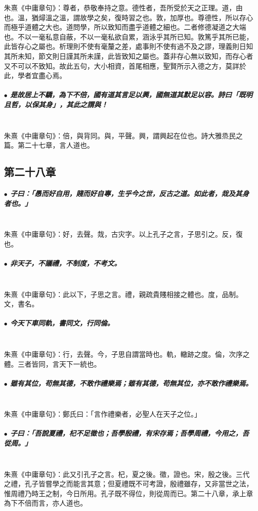 \documentclass[hyperref, UTF8, 12pt, a4paper]{ctexrep}
\begin{document}
朱熹《中庸章句》：尊者，恭敬奉持之意。德性者，吾所受於天之正理。道，由也。溫，猶燖溫之溫，謂故學之矣，復時習之也。敦，加厚也。尊德性，所以存心而極乎道體之大也。道問學，所以致知而盡乎道體之細也。二者修德凝道之大端也。不以一毫私意自蔽，不以一毫私欲自累，涵泳乎其所已知。敦篤乎其所已能，此皆存心之屬也。析理則不使有毫釐之差，處事則不使有過不及之謬，理義則日知其所未知，節文則日謹其所未謹，此皆致知之屬也。蓋非存心無以致知，而存心者又不可以不致知。故此五句，大小相資，首尾相應，聖賢所示入德之方，莫詳於此，學者宜盡心焉。

\subparagraph{$\bullet$ 是故居上不驕，為下不倍，國有道其言足以興，國無道其默足以容。詩曰「既明且哲，以保其身」，其此之謂與！} ~\\

朱熹《中庸章句》：倍，與背同。與，平聲。興，謂興起在位也。詩大雅烝民之篇。第二十七章，言人道也。

\newpage
\subsection{第二十八章}

\subparagraph{$\bullet$ 子曰：「愚而好自用，賤而好自專，生乎今之世，反古之道。如此者，烖及其身者也。」} ~\\

朱熹《中庸章句》：好，去聲。烖，古灾字。以上孔子之言，子思引之。反，復也。

\subparagraph{$\bullet$ 非天子，不議禮，不制度，不考文。} ~\\

朱熹《中庸章句》：此以下，子思之言。禮，親疏貴賤相接之體也。度，品制。文，書名。

\subparagraph{$\bullet$ 今天下車同軌，書同文，行同倫。} ~\\

朱熹《中庸章句》：行，去聲。今，子思自謂當時也。軌，轍跡之度。倫，次序之體。三者皆同，言天下一統也。

\subparagraph{$\bullet$ 雖有其位，苟無其德，不敢作禮樂焉；雖有其德，苟無其位，亦不敢作禮樂焉。} ~\\

朱熹《中庸章句》：鄭氏曰：「言作禮樂者，必聖人在天子之位。」

\subparagraph{$\bullet$ 子曰：「吾說夏禮，杞不足徵也；吾學殷禮，有宋存焉；吾學周禮，今用之，吾從周。」} ~\\

朱熹《中庸章句》：此又引孔子之言。杞，夏之後。徵，證也。宋，殷之後。三代之禮，孔子皆嘗學之而能言其意；但夏禮既不可考證，殷禮雖存，又非當世之法，惟周禮乃時王之制，今日所用。孔子既不得位，則從周而已。第二十八章，承上章為下不倍而言，亦人道也。
\end{document}
